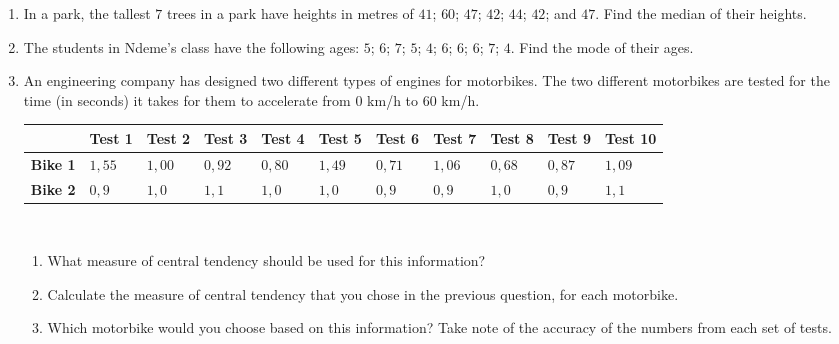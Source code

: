 \begin{eocexercises}{}
  \begin{enumerate}[itemsep=6pt, label=\textbf{\arabic*}.]

  \item 
  In a park, the tallest $7$ trees in a park have heights in metres of
    $41$; $60$; $47$; $42$; $44$; $42$; and $47$. Find the median of
    their heights.

  \item The students in Ndeme's class have the following ages: $5$;
    $6$; $7$; $5$; $4$; $6$; $6$; $6$; $7$; $4$. Find the mode of
    their ages.

  \item An engineering company has designed two different types of
    engines for motorbikes. The two different motorbikes are tested
    for the time (in seconds) it takes for them to accelerate from $0$
    km/h to $60$ km/h.

    \begin{center}
      \begin{tabular}{|p{0.9cm}|p{0.8cm}|p{0.8cm}|p{0.8cm}|p{0.8cm}|p{0.8cm}|p{0.8cm}|p{0.8cm}|p{0.8cm}|p{0.8cm}|p{1cm}|} \hline
     
        & \textbf{Test 1} & \textbf{Test 2} & \textbf{Test 3} & \textbf{Test 4} & \textbf{Test 5} & \textbf{Test 6} & \textbf{Test 7} &\textbf{Test 8} & \textbf{Test 9} & \textbf{Test 10} \\\hline
        \textbf{Bike 1} & $1,55$ & $1,00$ & $0,92$ & $0,80$ & $1,49$ & $0,71$ & $1,06$ & $0,68$ & $0,87$ & $1,09$ \\\hline
        \textbf{Bike 2} & $0,9$ & $1,0$ & $1,1$ & $1,0$ & $1,0$ & $0,9$ & $0,9$ & $1,0$ & $0,9$ & $1,1$ \\\hline

      \end{tabular}
    \end{center}
\vspace {8pt}\\
\begin{enumerate}[noitemsep, label=\textbf{(\alph*)} ]
    \item What measure of central tendency should be used for this
      information?
    \item Calculate the measure of central tendency that you chose in
      the previous question, for each motorbike.
    \item Which motorbike would you choose based on this information?
      Take note of the accuracy of the numbers from each set of tests.
    \end{enumerate}


\end{enumerate}
\end{eocexercises}
